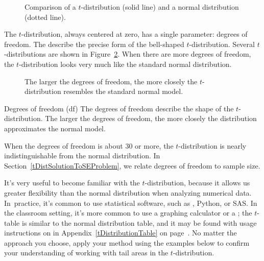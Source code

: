 \begin{figure}
  \centering
  \caption{Comparison of a $t$-distribution (solid line)
      and a normal distribution (dotted line).}
  \label{tDistCompareToNormalDist}
\end{figure}

The $t$-distribution, always centered at zero, has a single parameter: degrees of freedom. The  describe the precise form of the bell-shaped $t$-distribution. Several $t$-distributions are shown in Figure~\ref{tDistConvergeToNormalDist}. When there are more degrees of freedom, the $t$-distribution looks very much like the standard normal distribution.

\begin{figure}
  \centering
  \caption{The larger the degrees of freedom, the more
      closely the $t$-distribution resembles the standard
      normal model.}
  \label{tDistConvergeToNormalDist}
\end{figure}

\begin{onebox}{Degrees of freedom (df)}
The degrees of freedom describe the shape of the $t$-distribution. The larger the degrees of freedom, the more closely the distribution approximates the normal model.
\end{onebox}

When the degrees of freedom is about 30 or more, the $t$-distribution is nearly indistinguishable from the normal distribution. In Section~\ref{tDistSolutionToSEProblem}, we relate degrees of freedom to sample size.

It's very useful to become familiar with the $t$-distribution, because it allows us greater flexibility than the normal distribution when analyzing numerical data.
In~practice, it's common to use statistical software,
such as \R{}, Python, or SAS.
In the classroom setting, it's more common to use
a graphing calculator or a ;
the $t$-table is similar to the normal distribution table,
and it may be found with usage instructions on
in Appendix~\ref{tDistributionTable}
on page~\pageref{tDistributionTable}.
No matter the approach you choose, apply your method
using the examples below to confirm your understanding
of working with tail areas in the $t$-distribution.

